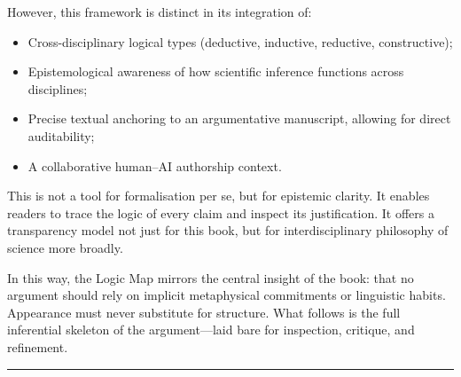 \documentclass[12pt]{book}
\begin{document}
However, this framework is distinct in its integration of:
\begin{itemize}
  \item Cross-disciplinary logical types (deductive, inductive, reductive, constructive);
  \item Epistemological awareness of how scientific inference functions across disciplines;
  \item Precise textual anchoring to an argumentative manuscript, allowing for direct auditability;
  \item A collaborative human–AI authorship context.
\end{itemize}

This is not a tool for formalisation per se, but for epistemic clarity. It enables readers to trace the logic of every claim and inspect its justification. It offers a transparency model not just for this book, but for interdisciplinary philosophy of science more broadly.

In this way, the Logic Map mirrors the central insight of the book: that no argument should rely on implicit metaphysical commitments or linguistic habits. Appearance must never substitute for structure. What follows is the full inferential skeleton of the argument---laid bare for inspection, critique, and refinement.

\vspace{1em}
\hrule
\vspace{1em}
\end{document}
